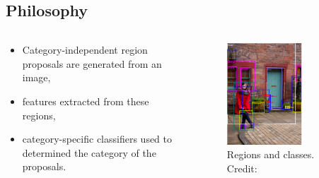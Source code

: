 \documentclass{beamer}
\begin{document}
\subsection{Philosophy}
\begin{frame}{}
	\begin{columns}
		\begin{column}{0.5\textwidth}
			\begin{itemize}
				\item Category-independent region proposals are generated from an image,
				\item features extracted from these regions,
				\item category-specific classifiers used to determined the category of the proposals.
			\end{itemize}
		\end{column}
		\begin{column}{0.5\textwidth}
			\begin{figure}
				\centering
				\includegraphics[width=0.7\textwidth]{images/image_example.PNG}
				\caption{Regions and classes.
					\hbox{\scriptsize Credit:}}
			\end{figure}
		\end{column}
	\end{columns}
\end{frame}
\end{document}
